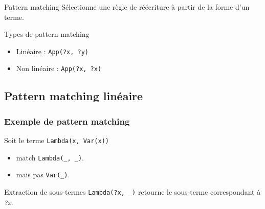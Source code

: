 
\begin{frame}

\begin{block}{Pattern matching}
Sélectionne une règle de réécriture à partir de la forme d'un terme.
\end{block}

\bigskip

\begin{block}{Types de pattern matching}
\begin{itemize}
\item Linéaire : \texttt{App(?x, ?y)}
\item Non linéaire : \texttt{App(?x, ?x)}
\end{itemize}
\end{block}

\end{frame}

\subsection{Pattern matching linéaire}

\begin{frame}
\frametitle{Exemple de pattern matching}

Soit le terme \texttt{Lambda(x, Var(x))}
\begin{itemize} 

  \item match \texttt{Lambda(\_, \_)}.
  \item mais pas \texttt{Var(\_)}.

\end{itemize}

\bigskip

\begin{block}{Extraction de sous-termes}
\texttt{Lambda(?x, \_)} retourne le sous-terme correspondant à \emph{?x}.
\end{block}

\end{frame}

